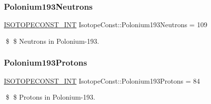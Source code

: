 \subsubsection{\texorpdfstring{Polonium193\+Neutrons}{Polonium193Neutrons}}
{\footnotesize\ttfamily \mbox{\hyperlink{group___isotope_const-_macros_ga5f18360b3e99483a35c32d789e62621c}{I\+S\+O\+T\+O\+P\+E\+C\+O\+N\+S\+T\+\_\+\+I\+NT}} Isotope\+Const\+::\+Polonium193\+Neutrons = 109}

\$ \$ Neutrons in Polonium-\/193. \mbox{\label{group___isotope_const-_polonium-_po193_ga474c7395831c4ee70358d189b86f4642}} 
\subsubsection{\texorpdfstring{Polonium193\+Protons}{Polonium193Protons}}
{\footnotesize\ttfamily \mbox{\hyperlink{group___isotope_const-_macros_ga5f18360b3e99483a35c32d789e62621c}{I\+S\+O\+T\+O\+P\+E\+C\+O\+N\+S\+T\+\_\+\+I\+NT}} Isotope\+Const\+::\+Polonium193\+Protons = 84}

\$ \$ Protons in Polonium-\/193. 